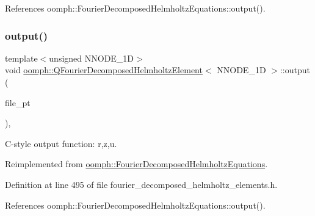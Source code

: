 References oomph\+::\+Fourier\+Decomposed\+Helmholtz\+Equations\+::output().

\mbox{\label{classoomph_1_1QFourierDecomposedHelmholtzElement_a36f0992d35d4f19d2d9cf3070b49bba1}} 
\subsubsection{\texorpdfstring{output()}{output()}\hspace{0.1cm}{\footnotesize\ttfamily [3/4]}}
{\footnotesize\ttfamily template$<$unsigned N\+N\+O\+D\+E\+\_\+1D$>$ \\
void \hyperlink{classoomph_1_1QFourierDecomposedHelmholtzElement}{oomph\+::\+Q\+Fourier\+Decomposed\+Helmholtz\+Element}$<$ N\+N\+O\+D\+E\+\_\+1D $>$\+::output (\begin{DoxyParamCaption}\item[{F\+I\+LE $\ast$}]{file\+\_\+pt }\end{DoxyParamCaption})\hspace{0.3cm}{\ttfamily [inline]}, {\ttfamily [virtual]}}



C-\/style output function\+: r,z,u. 



Reimplemented from \hyperlink{classoomph_1_1FourierDecomposedHelmholtzEquations_af4d25af42bb3ccacd49e12b93bb38953}{oomph\+::\+Fourier\+Decomposed\+Helmholtz\+Equations}.



Definition at line 495 of file fourier\+\_\+decomposed\+\_\+helmholtz\+\_\+elements.\+h.



References oomph\+::\+Fourier\+Decomposed\+Helmholtz\+Equations\+::output().

\mbox{\label{classoomph_1_1QFourierDecomposedHelmholtzElement_a846e28bf8f1bae1ace68b0b291688841}} 
